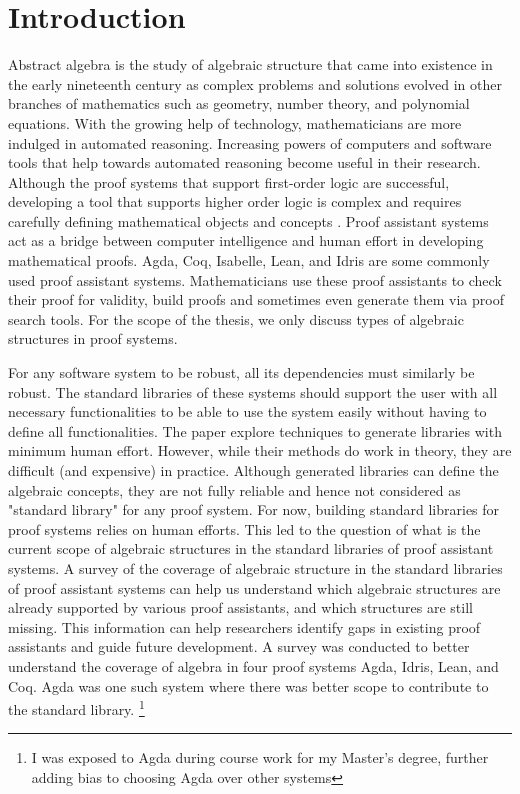\chapter{Introduction}
Abstract algebra is the study of algebraic structure that came into existence in
the early nineteenth century as complex problems and solutions evolved in other
branches of mathematics such as geometry, number theory, and polynomial
equations. With the growing help of technology, mathematicians are more indulged
in automated reasoning. Increasing powers of computers and software tools that
help towards automated reasoning become useful in their research. Although the
proof systems that support first-order logic are successful, developing a tool
that supports higher order logic is complex and requires carefully defining
mathematical objects and concepts \cite{phillips2010automated}. Proof assistant
systems act as a bridge between computer intelligence and human effort in
developing mathematical proofs. Agda, Coq, Isabelle, Lean, and Idris are some
commonly used proof assistant systems. Mathematicians use these proof assistants
to check their proof for validity, build proofs and sometimes even generate them
via proof search tools. For the scope of the thesis, we only discuss types of
algebraic structures in proof systems.

For any software system to be robust, all its dependencies must similarly be
robust. The standard libraries of these systems should support the user with all
necessary functionalities to be able to use the system easily without having to
define all functionalities. The paper \cite{BuildingDiamond} explore techniques
to generate libraries with minimum human effort. However, while their methods do
work in theory, they are difficult (and expensive) in practice. Although
generated libraries can define the algebraic concepts, they are not fully
reliable and hence not considered as "standard library" for any proof system.
For now, building standard libraries for proof systems relies on human efforts.
This led to the question of what is the current scope of algebraic structures in
the standard libraries of proof assistant systems. A survey of the coverage of
algebraic structure in the standard libraries of proof assistant systems can
help us understand which algebraic structures are already supported by various
proof assistants, and which structures are still missing. This information can
help researchers identify gaps in existing proof assistants and guide future
development. A survey was conducted to better understand the coverage of algebra
in four proof systems Agda, Idris, Lean, and Coq. Agda was one such system where
there was better scope to contribute to the standard library. \footnote{I was
exposed to Agda during course work for my Master's degree, further adding bias
to choosing Agda over other systems}

